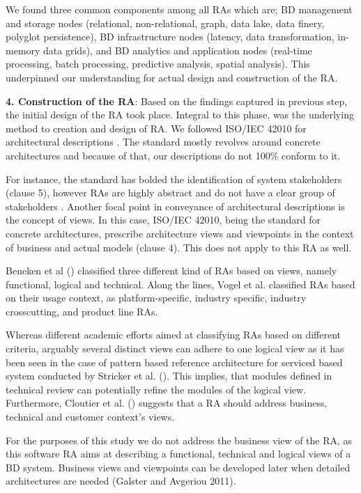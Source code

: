 \documentclass[conference]{IEEEtran}
\begin{document}
We found three common components among all RAs which are; BD management and storage nodes (relational, non-relational, graph, data lake, data finery, polyglot persistence), BD infrastructure nodes (latency, data transformation, in-memory data grids), and BD analytics and application nodes (real-time processing, batch processing, predictive analysis, spatial analysis). This underpinned our understanding for actual design and construction of the RA.

\textbf{4. Construction of the RA}: Based on the findings captured in previous step, the initial design of the RA took place. Integral to this phase, was the underlying method to creation and design of RA. We followed ISO/IEC 42010 for architectural descriptions \cite{Chaabane}. The standard mostly revolves around concrete architectures and because of that, our descriptions do not 100\% conform to it.

For instance, the standard has bolded the identification of system stakeholders (clause 5), however RAs are highly abstract and do not have a clear group of stakeholders \cite{AtaeiACIS}. Another focal point in conveyance of architectural descriptions is the concept of views. In this case, ISO/IEC 42010, being the standard for concrete architectures, prescribe architecture views and viewpoints in the context of business and actual models (clause 4). This does not apply to this RA as well.

Beneken et al (\cite{Beneken}) classified three different kind of RAs based on views, namely functional, logical and technical. Along the lines, Vogel et al. \cite{Vogel} classified RAs based on their usage context, as platform-specific, industry specific, industry crosscutting, and product line RAs.

Whereas different academic efforts aimed at classifying RAs based on different criteria, arguably several distinct views can adhere to one logical view as it has been seen in the case of pattern based reference architecture for serviced based system conducted by Stricker et al. (\cite{Stricker}). This implies, that modules defined in technical review can potentially refine the modules of the logical view. Furthermore, Cloutier et al. (\cite{Cloutier}) suggests that a RA should address business, technical and customer context’s views.

For the purposes of this study we do not address the business view of the RA, as this software RA aims at describing a functional, technical and logical views of a BD system. Business views and viewpoints can be developed later when detailed architectures are needed (Galster and Avgeriou 2011).
\end{document}
